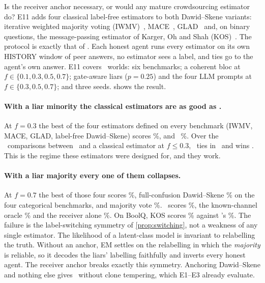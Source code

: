 Is the receiver anchor necessary, or would any mature crowdsourcing estimator do? E11 adds four classical label-free estimators to both Dawid--Skene variants: iterative weighted majority voting (IWMV)~\citep{li2014iwmv}, MACE~\citep{hovy2013}, GLAD~\citep{whitehill2009} and, on binary questions, the message-passing estimator of Karger, Oh and Shah (KOS)~\citep{karger2014}. The protocol is exactly that of \race. Each honest agent runs every estimator on its own HISTORY window of peer answers, no estimator sees a label, and ties go to the agent's own answer. E11 covers \nWorldsCrowd\ worlds: six benchmarks; a coherent bloc at $f\in\{0.1,0.3,0.5,0.7\}$; gate-aware liars ($p=0.25$) and the four LLM prompts at $f\in\{0.3,0.5,0.7\}$; and three seeds.  shows the result.

\paragraph{With a liar minority the classical estimators are as good as \race.} At $f=0.3$ the best of the four estimators defined on every benchmark (IWMV, MACE, GLAD, label-free Dawid--Skene) scores \crowdBestClassicalThree\%, and \race\ \crowdRaceThree\%. Over the \crowdClassicalCellsLow\ comparisons between \race\ and a classical estimator at $f\le0.3$, \race\ ties in \crowdClassicalTiesLow\ and wins \crowdClassicalWinsLow. This is the regime these estimators were designed for, and they work.

\paragraph{With a liar majority every one of them collapses.} At $f=0.7$ the best of those four scores \crowdBestClassicalSeven\%, full-confusion Dawid--Skene \crowdDsFullSeven\% on the four categorical benchmarks, and majority vote \crowdMajSeven\%. \race\ scores \crowdRaceSeven\%, the known-channel oracle \crowdOracleSeven\% and the receiver alone \crowdSelfSeven\%. On BoolQ, KOS scores \crowdBoolqKosSeven\% against \race's \crowdBoolqRaceSeven\%. The failure is the label-switching symmetry of \cref{prop:switching}, not a weakness of any single estimator. The likelihood of a latent-class model is invariant to relabelling the truth. Without an anchor, EM settles on the relabelling in which the \emph{majority} is reliable, so it decodes the liars' labelling faithfully and inverts every honest agent. The receiver anchor breaks exactly this symmetry. Anchoring Dawid--Skene and nothing else gives \race\ without clone tempering, which E1--E3 already evaluate.

